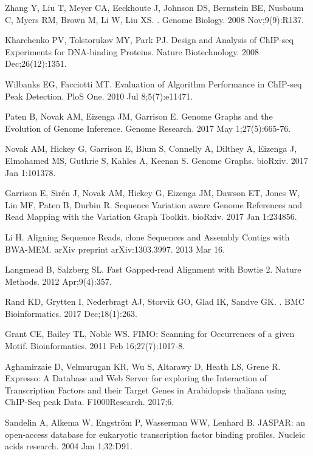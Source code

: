 \documentclass[10pt,letterpaper]{article}
\begin{document}
{\begin{thebibliography}{10}


Zhang Y, Liu T, Meyer CA, Eeckhoute J, Johnson DS, Bernstein BE, Nusbaum C, Myers RM, Brown M, Li W, Liu XS. 
. 
\newblock Genome Biology. 2008 Nov;9(9):R137.

Kharchenko PV, Tolstorukov MY, Park PJ. Design and Analysis of ChIP-seq Experiments for DNA-binding Proteins. Nature Biotechnology. 2008 Dec;26(12):1351.

Wilbanks EG, Facciotti MT. Evaluation of Algorithm Performance in ChIP-seq Peak Detection. PloS One. 2010 Jul 8;5(7):e11471.

Paten B, Novak AM, Eizenga JM, Garrison E. Genome Graphs and the Evolution of Genome Inference. Genome Research. 2017 May 1;27(5):665-76.

Novak AM, Hickey G, Garrison E, Blum S, Connelly A, Dilthey A, Eizenga J, Elmohamed MS, Guthrie S, Kahles A, Keenan S. Genome Graphs. bioRxiv. 2017 Jan 1:101378.


Garrison E, Sirén J, Novak AM, Hickey G, Eizenga JM, Dawson ET, Jones W, Lin MF, Paten B, Durbin R. Sequence Variation aware Genome References and Read Mapping with the Variation Graph Toolkit. bioRxiv. 2017 Jan 1:234856.


Li H. Aligning Sequence Reads, clone Sequences and Assembly Contigs with BWA-MEM. arXiv preprint arXiv:1303.3997. 2013 Mar 16.

Langmead B, Salzberg SL. Fast Gapped-read Alignment with Bowtie 2. Nature Methods. 2012 Apr;9(4):357.

Rand KD, Grytten I, Nederbragt AJ, Storvik GO, Glad IK, Sandve GK. 
. 
\newblock BMC Bioinformatics. 2017 Dec;18(1):263.

Grant CE, Bailey TL, Noble WS. FIMO: Scanning for Occurrences of a given Motif. Bioinformatics. 2011 Feb 16;27(7):1017-8.

Aghamirzaie D, Velmurugan KR, Wu S, Altarawy D, Heath LS, Grene R. Expresso: A Database and Web Server for exploring the Interaction of Transcription Factors and their Target Genes in Arabidopsis thaliana using ChIP-Seq peak Data. F1000Research. 2017;6.

Sandelin A, Alkema W, {Engström} P, Wasserman WW, Lenhard B. 
JASPAR: an open\--access database for eukaryotic transcription factor binding profiles. Nucleic acids research. 2004 Jan 1;32:D91.


\end{thebibliography}}
\end{document}
